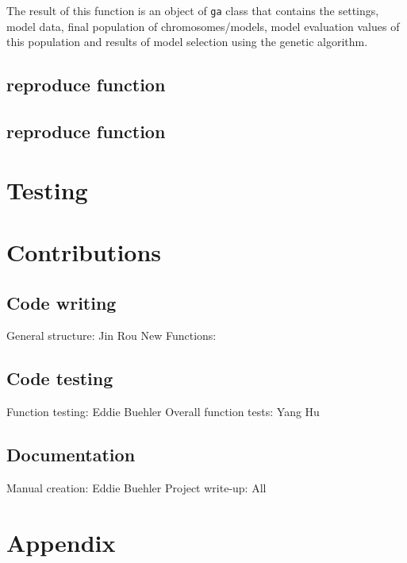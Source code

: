 \documentclass[11pt]{article}
\begin{document}
The result of this function is an object of \texttt{ga} class that contains the settings, model data, final population of chromosomes/models, model evaluation values of this population and results of model selection using the genetic algorithm.

\subsection{reproduce function}

\subsection{reproduce function}

\section{Testing} 

\section{Contributions} 
\subsection{Code writing}
General structure: Jin Rou New
Functions:

\subsection{Code testing}
Function testing: Eddie Buehler
Overall function tests: Yang Hu

\subsection{Documentation}
Manual creation: Eddie Buehler
Project write-up: All

\section{Appendix}

\end{document}
